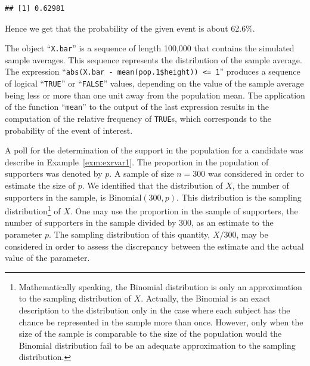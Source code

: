 \documentclass[
]{krantz}
\makeatletter
\newenvironment{Shaded}{\begin{snugshade}}{\end{snugshade}}
\newcommand{\DecValTok}[1]{\textcolor[rgb]{0.00,0.00,0.81}{#1}}
\newcommand{\FloatTok}[1]{\textcolor[rgb]{0.00,0.00,0.81}{#1}}
\newcommand{\KeywordTok}[1]{\textcolor[rgb]{0.13,0.29,0.53}{\textbf{#1}}}
\newcommand{\NormalTok}[1]{#1}
\newcommand{\OperatorTok}[1]{\textcolor[rgb]{0.81,0.36,0.00}{\textbf{#1}}}
\newcommand{\StringTok}[1]{\textcolor[rgb]{0.31,0.60,0.02}{#1}}
\newenvironment{kframe}{%
\medskip{}
\setlength{\fboxsep}{.8em}
 \def\at@end@of@kframe{}%
 \ifinner\ifhmode%
  \def\at@end@of@kframe{\end{minipage}}%
  \begin{minipage}{\columnwidth}%
 \fi\fi%
 \def\FrameCommand##1{\hskip\@totalleftmargin \hskip-\fboxsep
 \colorbox{shadecolor}{##1}\hskip-\fboxsep
     \hskip-\linewidth \hskip-\@totalleftmargin \hskip\columnwidth}%
 \MakeFramed {\advance\hsize-\width
   \@totalleftmargin\z@ \linewidth\hsize
   \@setminipage}}%
 {\par\unskip\endMakeFramed%
 \at@end@of@kframe}
\renewenvironment{Shaded}{\begin{kframe}}{\end{kframe}}
\theoremstyle{definition}
\theoremstyle{definition}
\theoremstyle{definition}
\theoremstyle{remark}
\let\BeginKnitrBlock\begin \let\EndKnitrBlock\end
\makeatother
\begin{document}
\begin{Shaded}
\end{Shaded}

\begin{verbatim}
## [1] 0.62981
\end{verbatim}

Hence we get that the probability of the given event is about 62.6\%.

The object ``\texttt{X.bar}'' is a sequence of length 100,000 that contains the
simulated sample averages. This sequence represents the distribution of
the sample average. The expression
``\texttt{abs(X.bar\ -\ mean(pop.1\$height))\ \textless{}=\ 1}'' produces a sequence of logical
``\texttt{TRUE}'' or ``\texttt{FALSE}'' values, depending on the value of the sample
average being less or more than one unit away from the population mean.
The application of the function ``\texttt{mean}'' to the output of the last
expression results in the computation of the relative frequency of
\texttt{TRUE}s, which corresponds to the probability of the event of interest.

\BeginKnitrBlock{example}
\protect\hypertarget{exm:exsampdist1}{}{\label{exm:exsampdist1} }A poll for the determination of the support in the
population for a candidate was describe in
Example~\ref{exm:exrvar1}. The proportion in the population of
supporters was denoted by \(p\). A sample of size \(n=300\) was considered
in order to estimate the size of \(p\). We identified that the
distribution of \(X\), the number of supporters in the sample, is
\(\mathrm{Binomial}(300,p)\). This distribution is the sampling
distribution\footnote{Mathematically speaking, the Binomial distribution is only an
  approximation to the sampling distribution of \(X\). Actually, the
  Binomial is an exact description to the distribution only in the
  case where each subject has the chance be represented in the sample
  more than once. However, only when the size of the sample is
  comparable to the size of the population would the Binomial
  distribution fail to be an adequate approximation to the sampling
  distribution.} of \(X\). One may use the proportion in the sample of
supporters, the number of supporters in the sample divided by 300, as an
estimate to the parameter \(p\). The sampling distribution of this
quantity, \(X/300\), may be considered in order to assess the discrepancy
between the estimate and the actual value of the parameter.
\EndKnitrBlock{example}
\end{document}

